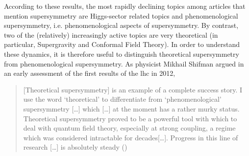 \documentclass[smallextended]{svjour3}
\begin{document}
According to these results, the most rapidly declining topics among articles that mention supersymmetry are Higgs-sector related topics and phenomenological supersymmetry, i.e. phenomenological aspects of supersymmetry. By contrast, two of the (relatively) increasingly active topics are very theoretical (in particular, Supergravity and Conformal Field Theory). %
In order to understand these dynamics, it is therefore useful to distinguish theoretical supersymmetry from phenomenological supersymmetry. As physicist Mikhail Shifman argued in an early assessment of the first results of the \gls{lhc} in 2012, 

\begin{quote}
    [Theoretical supersymmetry] is an example of a complete success story. I use the word ‘theoretical’ to differentiate from ‘phenomenological’ supersymmetry [\dots] which [\dots] at the moment has a rather murky status. Theoretical supersymmetry proved to be a powerful tool with which to deal with quantum field theory, especially at strong coupling, a regime which was considered intractable for decades[\dots]. Progress in this line of research [\dots] is absolutely steady (\citealt[p.~6]{SHIFMAN2012})
\end{quote}


\end{document}
